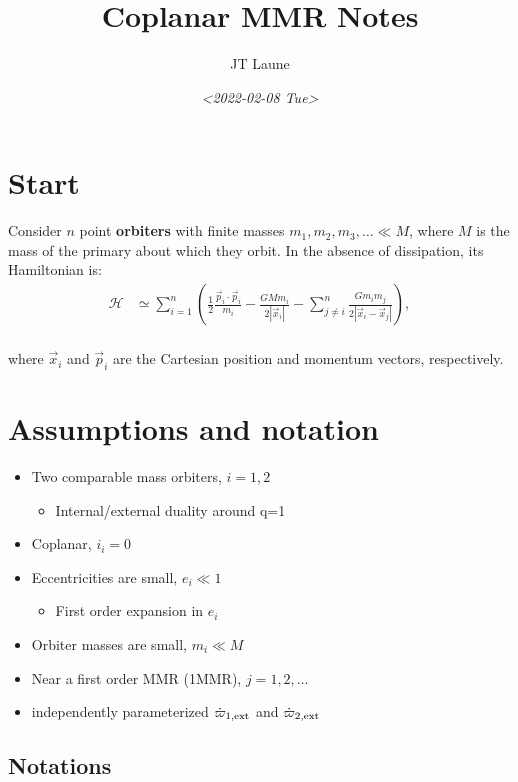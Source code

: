 \documentclass[11pt]{article}
\author{JT Laune}
\date{\textit{<2022-02-08 Tue>}}
\title{Coplanar MMR Notes}
\begin{document}
\maketitle

\section{Start}
\label{sec:org3a135b5}
Consider \(n\) point \textbf{orbiters} with finite masses
\(m_1,m_2,m_3,\ldots\ll M\), where \(M\) is the mass of the primary about
which they orbit. In the absence of dissipation, its Hamiltonian is:
\begin{align}
  \mathcal H
  &\simeq \sum^{n}_{i=1}\left(\frac12 \frac{\vec p_i\cdot\vec p_i}{m_i}
    -\frac{GMm_i}{2|\vec x_i|}
    -\sum_{j\neq i}^{n} \frac{Gm_im_j}{2|\vec x_i - \vec x_j|}
    \right), \\
\end{align}

where \(\vec x_i\) and \(\vec p_i\) are the Cartesian position and momentum vectors, respectively.

\section{Assumptions and notation}
\label{sec:org3c67772}
\begin{itemize}
\item Two comparable mass orbiters, \(i=1,2\)
\begin{itemize}
\item Internal/external duality around q=1
\end{itemize}
\item Coplanar, \(i_i=0\)
\item Eccentricities are small, \(e_i\ll 1\)
\begin{itemize}
\item First order expansion in \(e_i\)
\end{itemize}
\item Orbiter masses are small, \(m_i\ll M\)
\item Near a first order MMR (1MMR), \(j = 1, 2, \ldots\)
\item independently parameterized \(\dot\varpi_{1,\rm ext}\) and \(\dot\varpi_{2,\rm ext}\)
\end{itemize}
\subsection{Notations}
\label{sec:orgeb956b7}
\end{document}

